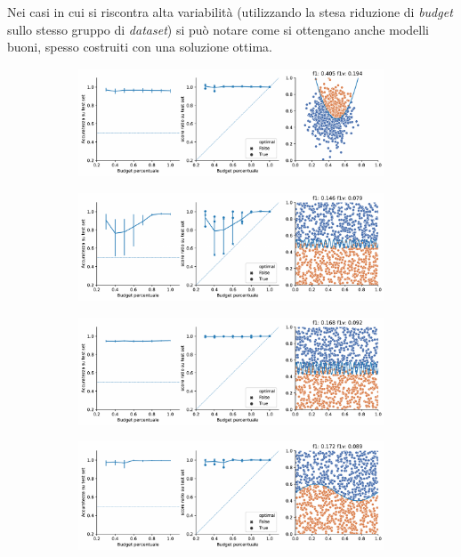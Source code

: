 Nei casi in cui si riscontra alta variabilità (utilizzando la stesa riduzione di \emph{budget} sullo stesso gruppo di \emph{dataset}) si può notare come si ottengano anche modelli buoni, spesso costruiti con una soluzione ottima.
\begin{figure}[b!]
    \begin{subfigure}{\textwidth}
        \centering
        \includegraphics[width=.8\textwidth]{img/2d/4.pdf}
    \end{subfigure}%
    \hfill
    \begin{subfigure}{\textwidth}
        \centering
        \includegraphics[width=.8\textwidth]{img/2d/8.pdf}
    \end{subfigure}%
    \hfill
    \begin{subfigure}{\textwidth}
        \centering
        \includegraphics[width=.8\textwidth]{img/2d/9.pdf}
    \end{subfigure}%
    \hfill
    \begin{subfigure}{\textwidth}
        \centering
        \includegraphics[width=.8\textwidth]{img/2d/10.pdf}

\end{subfigure}
\end{figure}
